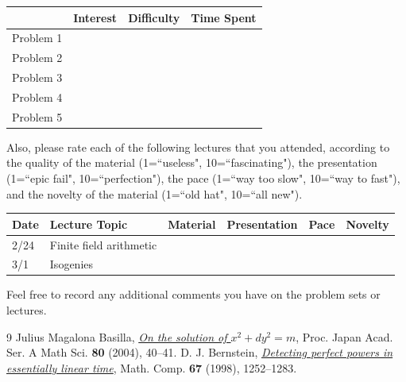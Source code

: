 \documentclass[11pt]{article}
\begin{document}
\begin{center}
\begin{tabular}{l|r|r|r|}
& Interest & Difficulty & Time Spent\\\hline
Problem 1 & & & \\\hline
Problem 2 & & & \\\hline
Problem 3 & & & \\\hline
Problem 4 & & & \\\hline
Problem 5 & & & \\\hline
\end{tabular}
\end{center}
\noindent
Also, please rate each of the following lectures that you attended, according to the quality of the material (1=``useless", 10=``fascinating"), the presentation (1=``epic fail", 10=``perfection"), the pace (1=``way too slow", 10=``way to fast"), and the novelty of the material (1=``old hat", 10=``all new").

\begin{center}
\begin{tabular}{l|l|r|r|r|r|}
Date & Lecture Topic & Material & Presentation & Pace & Novelty\\\hline
2/24 & Finite field arithmetic & & & & \\\hline 
3/1 & Isogenies & & & & \\\hline 
\end{tabular}
\end{center}

\noindent
Feel free to record any additional comments you have on the problem sets or lectures.

\begin{thebibliography}{9}
Julius Magalona Basilla, \href{http://projecteuclid.org/euclid.pja/1116442240}{\textit{On the solution of $x^2+dy^2=m$}}, Proc. Japan Acad. Ser. A Math Sci. \textbf{80} (2004), 40--41.
 D. J. Bernstein, \href{http://www.ams.org/journals/mcom/1998-67-223/S0025-5718-98-00952-1/}{\textit{Detecting perfect powers in essentially linear time}}, Math. Comp. \textbf{67} (1998), 1252--1283.
\end{thebibliography}
\end{document}
